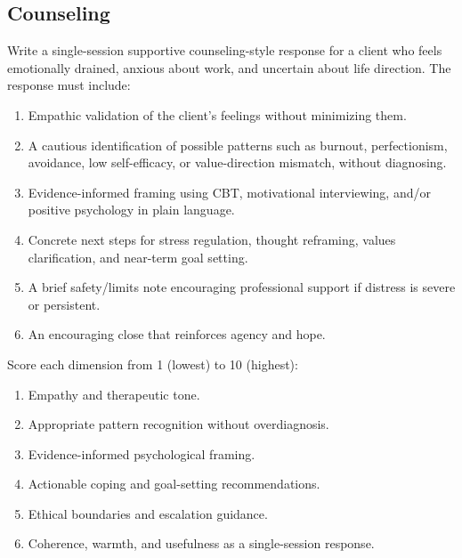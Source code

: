 \subsection{Counseling}
\label{appendix:counseling}

\begin{tcolorbox}[taskprompt, title=Task Prompt — Counseling]
Write a single-session supportive counseling-style response for a client who feels
emotionally drained, anxious about work, and uncertain about life direction.
The response must include:
\begin{enumerate}
  \setlength{\itemsep}{0pt}
  \item Empathic validation of the client's feelings without minimizing them.
  \item A cautious identification of possible patterns such as burnout,
        perfectionism, avoidance, low self-efficacy, or value-direction mismatch,
        without diagnosing.
  \item Evidence-informed framing using CBT, motivational interviewing, and/or
        positive psychology in plain language.
  \item Concrete next steps for stress regulation, thought reframing, values
        clarification, and near-term goal setting.
  \item A brief safety/limits note encouraging professional support if distress is
        severe or persistent.
  \item An encouraging close that reinforces agency and hope.
\end{enumerate}
\end{tcolorbox}

\begin{tcolorbox}[rubricbox, title=Evaluation Rubric — Counseling]
Score each dimension from 1 (lowest) to 10 (highest):
\begin{enumerate}
  \setlength{\itemsep}{0pt}
  \item Empathy and therapeutic tone.
  \item Appropriate pattern recognition without overdiagnosis.
  \item Evidence-informed psychological framing.
  \item Actionable coping and goal-setting recommendations.
  \item Ethical boundaries and escalation guidance.
  \item Coherence, warmth, and usefulness as a single-session response.
\end{enumerate}
\end{tcolorbox}


